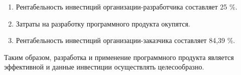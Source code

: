 \begin{enumerate}{locale=\arabic*.}
	\item Рентабельность инвестиций организации-разработчика составляет 25 \%.
	\item Затраты на разработку программного продукта окупятся.
	\item Рентабельность инвестиций организации-заказчика составляет 84,39 \%.
\end{enumerate}

Таким образом, разработка и применение программного продукта является эффективной и данные инвестиции осуществлять целесообразно.